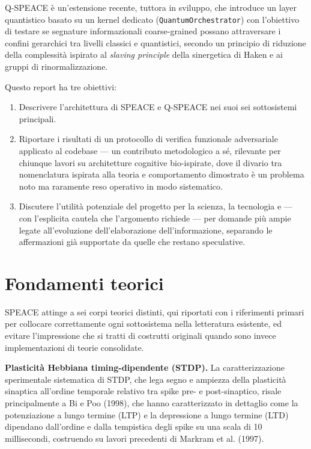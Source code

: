 \documentclass[11pt,a4paper]{article}
\newcommand{\code}[1]{\texttt{#1}}
\begin{document}
Q-SPEACE \`e un'estensione recente, tuttora in sviluppo, che introduce un layer quantistico basato su un kernel dedicato (\code{QuantumOrchestrator}) con l'obiettivo di testare se segnature informazionali coarse-grained possano attraversare i confini gerarchici tra livelli classici e quantistici, secondo un principio di riduzione della complessit\`a ispirato al \emph{slaving principle} della sinergetica di Haken e ai gruppi di rinormalizzazione.

Questo report ha tre obiettivi:

\begin{enumerate}
  \item Descrivere l'architettura di SPEACE e Q-SPEACE nei suoi sei sottosistemi principali.
  \item Riportare i risultati di un protocollo di verifica funzionale adversariale applicato al codebase --- un contributo metodologico a s\'e, rilevante per chiunque lavori su architetture cognitive bio-ispirate, dove il divario tra nomenclatura ispirata alla teoria e comportamento dimostrato \`e un problema noto ma raramente reso operativo in modo sistematico.
  \item Discutere l'utilit\`a potenziale del progetto per la scienza, la tecnologia e --- con l'esplicita cautela che l'argomento richiede --- per domande pi\`u ampie legate all'evoluzione dell'elaborazione dell'informazione, separando le affermazioni gi\`a supportate da quelle che restano speculative.
\end{enumerate}

\section{Fondamenti teorici}
\label{sec:theory}

SPEACE attinge a sei corpi teorici distinti, qui riportati con i riferimenti primari per collocare correttamente ogni sottosistema nella letteratura esistente, ed evitare l'impressione che si tratti di costrutti originali quando sono invece implementazioni di teorie consolidate.

\textbf{Plasticit\`a Hebbiana timing-dipendente (STDP).} La caratterizzazione sperimentale sistematica di STDP, che lega segno e ampiezza della plasticit\`a sinaptica all'ordine temporale relativo tra spike pre- e post-sinaptico, risale principalmente a Bi e Poo (1998), che hanno caratterizzato in dettaglio come la potenziazione a lungo termine (LTP) e la depressione a lungo termine (LTD) dipendano dall'ordine e dalla tempistica degli spike su una scala di 10 millisecondi, costruendo su lavori precedenti di Markram et al. (1997).
\end{document}
